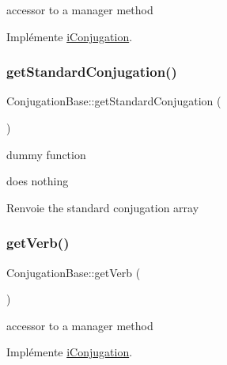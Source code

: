 accessor to a manager method 

Implémente \hyperlink{interfacei_conjugation_a58e61c703ad1f0d76db1535235e530a0}{i\+Conjugation}.

\hypertarget{class_conjugation_base_a97684bf47a4b158a2d4f5716f9187730}{}\label{class_conjugation_base_a97684bf47a4b158a2d4f5716f9187730} 
\subsubsection{\texorpdfstring{get\+Standard\+Conjugation()}{getStandardConjugation()}}
{\footnotesize\ttfamily Conjugation\+Base\+::get\+Standard\+Conjugation (\begin{DoxyParamCaption}{ }\end{DoxyParamCaption})\hspace{0.3cm}{\ttfamily [protected]}}



dummy function 

does nothing

\begin{DoxyReturn}{Renvoie}
the standard conjugation array 
\end{DoxyReturn}
\hypertarget{class_conjugation_base_a732cbfda6f4c28efeec68fc85aa9b65a}{}\label{class_conjugation_base_a732cbfda6f4c28efeec68fc85aa9b65a} 
\subsubsection{\texorpdfstring{get\+Verb()}{getVerb()}}
{\footnotesize\ttfamily Conjugation\+Base\+::get\+Verb (\begin{DoxyParamCaption}{ }\end{DoxyParamCaption})}

accessor to a manager method 

Implémente \hyperlink{interfacei_conjugation_a5742a474f6114e172337a38ca2c8bae8}{i\+Conjugation}.

\hypertarget{class_conjugation_base_a918aff5acf4210cf363a13cf39e2430d}{}\label{class_conjugation_base_a918aff5acf4210cf363a13cf39e2430d} 
